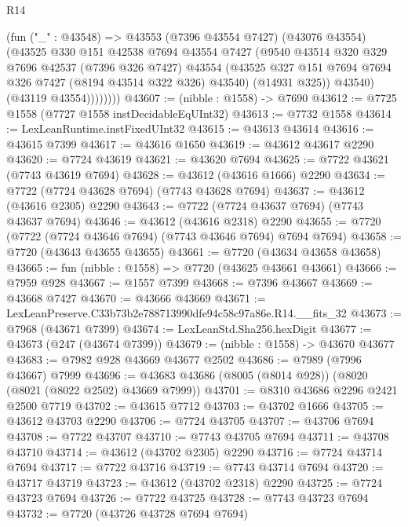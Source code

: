 \begin{lexlean}{R14}
\begin{coremodule}
                (fun ("_" : @43548) =>
                @43553
                  (@7396 @43554 @7427)
                  (@43076 @43554)
                  (@43525
                    @330
                    @151
                    @42538
                    @7694
                    @43554
                    @7427
                    (@9540
                      @43514
                      @320
                      @329
                      @7696
                      @42537
                      (@7396 @326 @7427)
                      @43554
                      (@43525 @327 @151 @7694 @7694 @326 @7427 (@8194 @43514 @322 @326) @43540)
                      (@14931 @325))
                    @43540)
                  (@43119 @43554))))))))
@43607 := (nibble : @1558) -> @7690
@43612 := @7725 @1558 (@7727 @1558 instDecidableEqUInt32)
@43613 := @7732 @1558
@43614 := LexLeanRuntime.instFixedUInt32
@43615 := @43613 @43614
@43616 := @43615 @7399
@43617 := @43616 @1650
@43619 := @43612 @43617 @2290
@43620 := @7724 @43619
@43621 := @43620 @7694
@43625 := @7722 @43621 (@7743 @43619 @7694)
@43628 := @43612 (@43616 @1666) @2290
@43634 := @7722 (@7724 @43628 @7694) (@7743 @43628 @7694)
@43637 := @43612 (@43616 @2305) @2290
@43643 := @7722 (@7724 @43637 @7694) (@7743 @43637 @7694)
@43646 := @43612 (@43616 @2318) @2290
@43655 := @7720 (@7722 (@7724 @43646 @7694) (@7743 @43646 @7694) @7694 @7694)
@43658 := @7720 (@43643 @43655 @43655)
@43661 := @7720 (@43634 @43658 @43658)
@43665 := fun (nibble : @1558) => @7720 (@43625 @43661 @43661)
@43666 := @7959 @928
@43667 := @1557 @7399
@43668 := @7396 @43667
@43669 := @43668 @7427
@43670 := @43666 @43669
@43671 := LexLeanPreserve.C33b73b2e788713990dfe94c58c97a86e.R14.__fits_32
@43673 := @7968 (@43671 @7399)
@43674 := LexLeanStd.Sha256.hexDigit
@43677 := @43673 (@247 (@43674 @7399))
@43679 := (nibble : @1558) -> @43670 @43677
@43683 := @7982 @928 @43669 @43677 @2502
@43686 := @7989 (@7996 @43667) @7999
@43696 := @43683 @43686 (@8005 (@8014 @928)) (@8020 (@8021 (@8022 @2502) @43669 @7999))
@43701 := @8310 @43686 @2296 @2421 @2500 @7719
@43702 := @43615 @7712
@43703 := @43702 @1666
@43705 := @43612 @43703 @2290
@43706 := @7724 @43705
@43707 := @43706 @7694
@43708 := @7722 @43707
@43710 := @7743 @43705 @7694
@43711 := @43708 @43710
@43714 := @43612 (@43702 @2305) @2290
@43716 := @7724 @43714 @7694
@43717 := @7722 @43716
@43719 := @7743 @43714 @7694
@43720 := @43717 @43719
@43723 := @43612 (@43702 @2318) @2290
@43725 := @7724 @43723 @7694
@43726 := @7722 @43725
@43728 := @7743 @43723 @7694
@43732 := @7720 (@43726 @43728 @7694 @7694)

\end{coremodule}
\end{lexlean}
